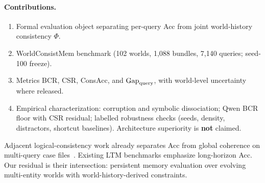 \paragraph{Contributions.}
\begin{enumerate}[leftmargin=*,itemsep=1pt]
\item Formal evaluation object separating per-query Acc from joint world-history consistency $\Phi$.
\item WorldConsistMem benchmark (102 worlds, 1{,}088 bundles, 7{,}140 queries; seed-100 freeze).
\item Metrics BCR, CSR, ConsAcc, and $\mathrm{Gap}_{\mathrm{query}}$, with world-level uncertainty where released.
\item Empirical characterization: corruption and symbolic dissociation; Qwen BCR floor with CSR residual; labelled robustness checks (seeds, density, distractors, shortcut baselines). Architecture superiority is \textbf{not} claimed.
\end{enumerate}

Adjacent logical-consistency work already separates Acc from global coherence on multi-query case files~\citep{salla2026crossQueryContradictions,chaudhry2026logicVault}. Existing LTM benchmarks emphasize long-horizon Acc. Our residual is their intersection: persistent memory evaluation over evolving multi-entity worlds with world-history-derived constraints.
